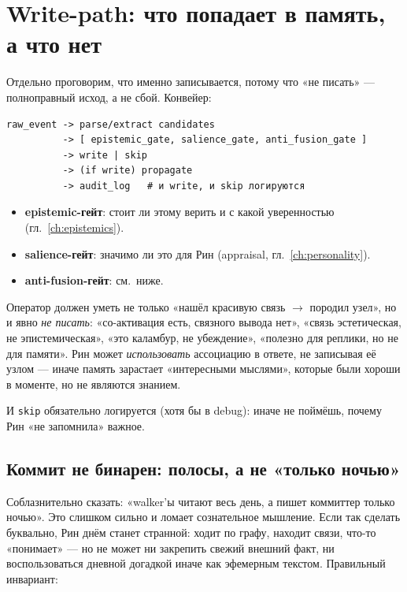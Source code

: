 \section{Write-path: что попадает в память, а что нет}
\label{sec:writepath}

Отдельно проговорим, что именно записывается, потому что «не писать» — полноправный
исход, а не сбой. Конвейер:
\begin{lstlisting}[style=pseudo]
raw_event -> parse/extract candidates
          -> [ epistemic_gate, salience_gate, anti_fusion_gate ]
          -> write | skip
          -> (if write) propagate
          -> audit_log   # и write, и skip логируются
\end{lstlisting}
\begin{itemize}\itemsep1pt
\item \textbf{epistemic-гейт}: стоит ли этому верить и с какой уверенностью (гл.~\ref{ch:epistemics}).
\item \textbf{salience-гейт}: значимо ли это для Рин (appraisal, гл.~\ref{ch:personality}).
\item \textbf{anti-fusion-гейт}: см.\ ниже.
\end{itemize}

\begin{principle}
Оператор должен уметь не только «нашёл красивую связь $\to$ породил узел», но и
явно \emph{не писать}: «со-активация есть, связного вывода нет», «связь эстетическая,
не эпистемическая», «это каламбур, не убеждение», «полезно для реплики, но не для
памяти». Рин может \emph{использовать} ассоциацию в ответе, не записывая её узлом —
иначе память зарастает «интересными мыслями», которые были хороши в моменте, но не
являются знанием.
\end{principle}

И \texttt{skip} обязательно логируется (хотя бы в debug): иначе не поймёшь, почему
Рин «не запомнила» важное.

\subsection{Коммит не бинарен: полосы, а не «только ночью»}
\label{sec:commitlanes}

Соблазнительно сказать: «walker'ы читают весь день, а пишет коммиттер только ночью».
Это слишком сильно и ломает сознательное мышление. Если так сделать буквально, Рин
днём станет странной: ходит по графу, находит связи, что-то «понимает» — но не может
ни закрепить свежий внешний факт, ни воспользоваться дневной догадкой иначе как
эфемерным текстом. Правильный инвариант:

